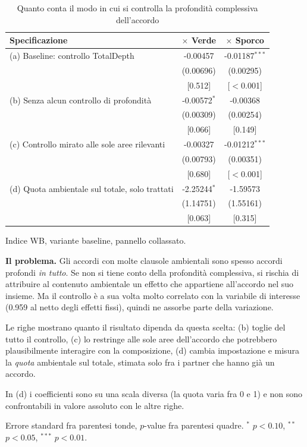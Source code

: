 \begin{table}[htbp]
\centering
\footnotesize
\caption{Quanto conta il modo in cui si controlla la profondit\`a complessiva dell'accordo}
\label{tab:depthctrl}
\begin{threeparttable}
\begin{tabular}{lcc}
\toprule
Specificazione & $\times$ Verde & $\times$ Sporco \\
\midrule
(a) Baseline: controllo TotalDepth & -0.00457 & -0.01187$^{***}$ \\
 & (0.00696) & (0.00295) \\
 & [0.512] & [$<$0.001] \\
\addlinespace
(b) Senza alcun controllo di profondit\`a & -0.00572$^{*}$ & -0.00368 \\
 & (0.00309) & (0.00254) \\
 & [0.066] & [0.149] \\
\addlinespace
(c) Controllo mirato alle sole aree rilevanti & -0.00327 & -0.01212$^{***}$ \\
 & (0.00793) & (0.00351) \\
 & [0.680] & [$<$0.001] \\
\addlinespace
(d) Quota ambientale sul totale, solo trattati & -2.25244$^{*}$ & -1.59573 \\
 & (1.14751) & (1.55161) \\
 & [0.063] & [0.315] \\
\bottomrule
\end{tabular}
\begin{tablenotes}[flushleft]\footnotesize
\item Indice WB, variante baseline, pannello collassato.
\item \textbf{Il problema.} Gli accordi con molte clausole ambientali sono spesso accordi profondi \emph{in tutto}. Se non si tiene conto della profondit\`a complessiva, si rischia di attribuire al contenuto ambientale un effetto che appartiene all'accordo nel suo insieme. Ma il controllo \`e a sua volta molto correlato con la variabile di interesse (0.959 al netto degli effetti fissi), quindi ne assorbe parte della variazione.
\item Le righe mostrano quanto il risultato dipenda da questa scelta: (b) toglie del tutto il controllo, (c) lo restringe alle sole aree dell'accordo che potrebbero plausibilmente interagire con la composizione, (d) cambia impostazione e misura la \emph{quota} ambientale sul totale, stimata solo fra i partner che hanno gi\`a un accordo.
\item In (d) i coefficienti sono su una scala diversa (la quota varia fra 0 e 1) e non sono confrontabili in valore assoluto con le altre righe.
\item Errore standard fra parentesi tonde, $p$-value fra parentesi quadre. $^{*}$ $p<0.10$, $^{**}$ $p<0.05$, $^{***}$ $p<0.01$.
\end{tablenotes}
\end{threeparttable}
\end{table}
